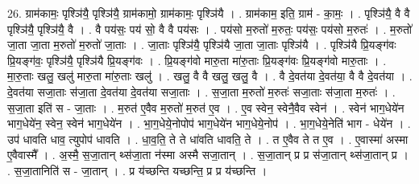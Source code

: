 \documentclass[17pt]{extarticle}
\begin{document}
26. ग्राम॑कामः॒ पृश्ञि॑यै॒ पृश्ञि॑यै॒ ग्राम॑कामो॒ ग्राम॑कामः॒ पृश्ञि॑यै । . ग्राम॑काम॒ इति॒ ग्राम॑ - का॒मः॒ । . पृश्ञि॑यै॒ वै वै पृश्ञि॑यै॒ पृश्ञि॑यै॒ वै । . वै पय॑सः॒ पय॑ सो॒ वै वै पय॑सः । . पय॑सो म॒रुतो॑ म॒रुतः॒ पय॑सः॒ पय॑सो म॒रुतः॑ । . म॒रुतो॑ जा॒ता जा॒ता म॒रुतो॑ म॒रुतो॑ जा॒ताः । . जा॒ताः पृश्ञि॑यै॒ पृश्ञि॑यै जा॒ता जा॒ताः पृश्ञि॑यै । . पृश्ञि॑यै प्रि॒यङ्ग॑वः प्रि॒यङ्ग॑वः॒ पृश्ञि॑यै॒ पृश्ञि॑यै प्रि॒यङ्ग॑वः । . प्रि॒यङ्ग॑वो मारु॒ता मा॑रु॒ताः प्रि॒यङ्ग॑वः प्रि॒यङ्ग॑वो मारु॒ताः । . मा॒रु॒ताः खलु॒ खलु॑ मारु॒ता मा॑रु॒ताः खलु॑ । . खलु॒ वै वै खलु॒ खलु॒ वै । . वै दे॒वत॑या दे॒वत॑या॒ वै वै दे॒वत॑या । . दे॒वत॑या सजा॒ताः स॑जा॒ता दे॒वत॑या दे॒वत॑या सजा॒ताः । . स॒जा॒ता म॒रुतो॑ म॒रुतः॑ सजा॒ताः स॑जा॒ता म॒रुतः॑ । . स॒जा॒ता इति॑ स - जा॒ताः । . म॒रुत॑ ए॒वैव म॒रुतो॑ म॒रुत॑ ए॒व । . ए॒व स्वेन॒ स्वेनै॒वैव स्वेन॑ । . स्वेन॑ भाग॒धेये॑न भाग॒धेये॑न॒ स्वेन॒ स्वेन॑ भाग॒धेये॑न । . भा॒ग॒धेये॒नोपोप॑ भाग॒धेये॑न भाग॒धेये॒नोप॑ । . भा॒ग॒धेये॒नेति॑ भाग - धेये॑न । . उप॑ धावति धाव॒ त्युपोप॑ धावति । . धा॒व॒ति॒ ते ते धा॑वति धावति॒ ते । . त ए॒वैव ते त ए॒व । . ए॒वास्मा॑ अस्मा ए॒वैवास्मै᳚ । . अ॒स्मै॒ स॒जा॒तान् थ्स॑जा॒ता न॑स्मा अस्मै सजा॒तान् । . स॒जा॒तान् प्र प्र स॑जा॒तान् थ्स॑जा॒तान् प्र । . स॒जा॒तानिति॑ स - जा॒तान् । . प्र य॑च्छन्ति यच्छन्ति॒ प्र प्र य॑च्छन्ति । \newline
\end{document}
